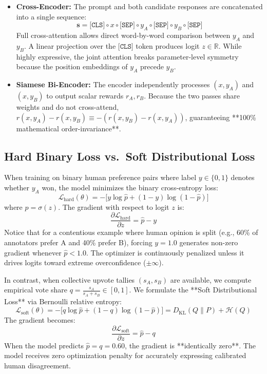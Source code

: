 \documentclass[12pt,a4paper]{article}
\begin{document}
\begin{itemize}
    \item \textbf{Cross-Encoder:} The prompt and both candidate responses are concatenated into a single sequence:
    \begin{equation}
        \mathbf{s} = \texttt{[CLS]} \circ x \circ \texttt{[SEP]} \circ y_A \circ \texttt{[SEP]} \circ y_B \circ \texttt{[SEP]}
    \end{equation}
    Full cross-attention allows direct word-by-word comparison between $y_A$ and $y_B$. A linear projection over the $\texttt{[CLS]}$ token produces logit $z \in \mathbb{R}$. While highly expressive, the joint attention breaks parameter-level symmetry because the position embeddings of $y_A$ precede $y_B$.
    \item \textbf{Siamese Bi-Encoder:} The encoder independently processes $(x, y_A)$ and $(x, y_B)$ to output scalar rewards $r_A, r_B$. Because the two passes share weights and do not cross-attend, $r(x, y_A) - r(x, y_B) \equiv -(r(x, y_B) - r(x, y_A))$, guaranteeing **100\% mathematical order-invariance**.
\end{itemize}

\subsection{Hard Binary Loss vs.\ Soft Distributional Loss}
When training on binary human preference pairs where label $y \in \{0, 1\}$ denotes whether $y_A$ won, the model minimizes the binary cross-entropy loss:
\begin{equation}
    \mathcal{L}_{\text{hard}}(\theta) = -\big[y \log \hat{p} + (1 - y) \log(1 - \hat{p})\big]
\end{equation}
where $\hat{p} = \sigma(z)$. The gradient with respect to logit $z$ is:
\begin{equation}
    \frac{\partial \mathcal{L}_{\text{hard}}}{\partial z} = \hat{p} - y
\end{equation}
Notice that for a contentious example where human opinion is split (e.g., 60\% of annotators prefer A and 40\% prefer B), forcing $y = 1.0$ generates non-zero gradient whenever $\hat{p} < 1.0$. The optimizer is continuously penalized unless it drives logits toward extreme overconfidence ($\pm \infty$).

In contrast, when collective upvote tallies $(s_A, s_B)$ are available, we compute empirical vote share $q = \frac{s_A}{s_A + s_B} \in [0, 1]$. We formulate the **Soft Distributional Loss** via Bernoulli relative entropy:
\begin{equation}
    \mathcal{L}_{\text{soft}}(\theta) = -\big[q \log \hat{p} + (1 - q) \log(1 - \hat{p})\big] = D_{\text{KL}}(Q \parallel P) + \mathcal{H}(Q)
\end{equation}
The gradient becomes:
\begin{equation}
    \frac{\partial \mathcal{L}_{\text{soft}}}{\partial z} = \hat{p} - q
\end{equation}
When the model predicts $\hat{p} = q = 0.60$, the gradient is **identically zero**. The model receives zero optimization penalty for accurately expressing calibrated human disagreement.
\end{document}
